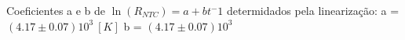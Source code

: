 
Coeficientes a e b de $\ln(R_{NTC}) = a + b t^-1$ determidados pela linearização:
a = $(4.17 \pm 0.07)10^3\ [K]$
b = $(4.17 \pm 0.07)10^3$
